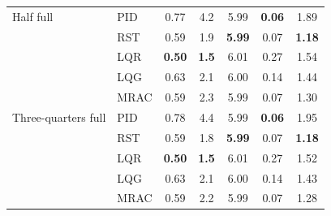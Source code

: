 \begin{table}[!ht]
\begin{tabular}{llccccc}
\addlinespace[2pt]
Half full & PID & 0.77 & 4.2 & 5.99 & \textbf{0.06} & 1.89 \\
 & RST & 0.59 & 1.9 & \textbf{5.99} & 0.07 & \textbf{1.18} \\
 & LQR & \textbf{0.50} & \textbf{1.5} & 6.01 & 0.27 & 1.54 \\
 & LQG & 0.63 & 2.1 & 6.00 & 0.14 & 1.44 \\
 & MRAC & 0.59 & 2.3 & 5.99 & 0.07 & 1.30 \\
\addlinespace[2pt]
Three-quarters full & PID & 0.78 & 4.4 & 5.99 & \textbf{0.06} & 1.95 \\
 & RST & 0.59 & 1.8 & \textbf{5.99} & 0.07 & \textbf{1.18} \\
 & LQR & \textbf{0.50} & \textbf{1.5} & 6.01 & 0.27 & 1.52 \\
 & LQG & 0.63 & 2.1 & 6.00 & 0.14 & 1.43 \\
 & MRAC & 0.59 & 2.2 & 5.99 & 0.07 & 1.28 \\
\bottomrule
\end{tabular}
\end{table}